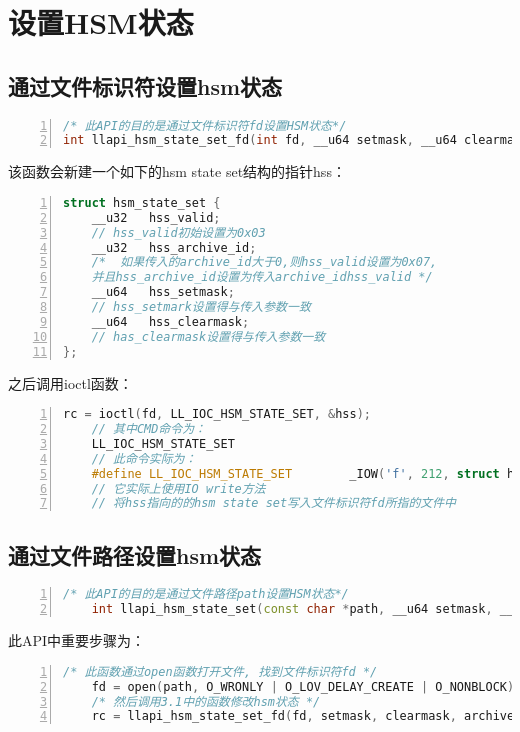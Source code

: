 \section{设置HSM状态}
\subsection{通过文件标识符设置hsm状态}
\begin{lstlisting}[language={c++},numbers=left]
/* 此API的目的是通过文件标识符fd设置HSM状态*/
int llapi_hsm_state_set_fd(int fd, __u64 setmask, __u64 clearmask, __u32 archive_id);
\end{lstlisting}
该函数会新建一个如下的hsm state set结构的指针hss：
\begin{lstlisting}[language={c++},numbers=left]
struct hsm_state_set {
	__u32	hss_valid;
	// hss_valid初始设置为0x03
	__u32	hss_archive_id;
	/*  如果传入的archive_id大于0,则hss_valid设置为0x07, 
	并且hss_archive_id设置为传入archive_idhss_valid */
	__u64	hss_setmask;
	// hss_setmark设置得与传入参数一致
	__u64	hss_clearmask;
	// has_clearmask设置得与传入参数一致
};
\end{lstlisting}

之后调用ioctl函数：
\begin{lstlisting}[language={c++},numbers=left]
	rc = ioctl(fd, LL_IOC_HSM_STATE_SET, &hss);
	// 其中CMD命令为：
	LL_IOC_HSM_STATE_SET
	// 此命令实际为：
	#define LL_IOC_HSM_STATE_SET		_IOW('f', 212, struct hsm_state_set)
	// 它实际上使用IO write方法
	// 将hss指向的的hsm state set写入文件标识符fd所指的文件中
\end{lstlisting}


\subsection{通过文件路径设置hsm状态}
\begin{lstlisting}[language={c++},numbers=left]
	/* 此API的目的是通过文件路径path设置HSM状态*/
	int llapi_hsm_state_set(const char *path, __u64 setmask, __u64 clearmask, __u32 archive_id);
\end{lstlisting}
此API中重要步骤为：
\begin{lstlisting}[language={c++},numbers=left]
	/* 此函数通过open函数打开文件, 找到文件标识符fd */
	fd = open(path, O_WRONLY | O_LOV_DELAY_CREATE | O_NONBLOCK);
	/* 然后调用3.1中的函数修改hsm状态 */
	rc = llapi_hsm_state_set_fd(fd, setmask, clearmask, archive_id);
\end{lstlisting}

